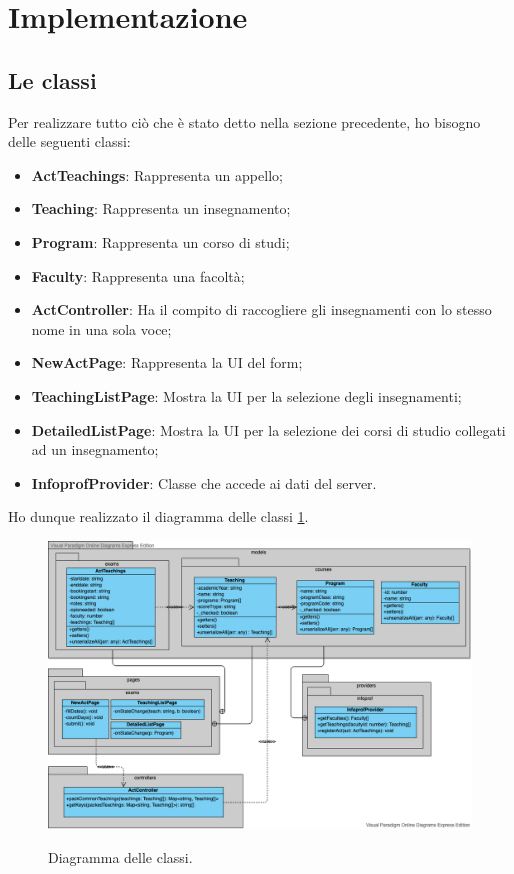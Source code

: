\documentclass[Lau, oneside, noexaminfo]{sapthesis}%
\begin{document}
\newpage
\section{Implementazione}
\label{sec:dev}
\subsection{Le classi}
Per realizzare tutto ciò che è stato detto nella sezione precedente, ho bisogno delle seguenti classi:
\begin{itemize}
	\item \textbf{ActTeachings}: Rappresenta un appello;
	\item \textbf{Teaching}: Rappresenta un insegnamento;
	\item \textbf{Program}: Rappresenta un corso di studi;
	\item \textbf{Faculty}: Rappresenta una facoltà;
	\item \textbf{ActController}: Ha il compito di raccogliere gli insegnamenti con lo stesso nome in una sola voce;
	\item \textbf{NewActPage}: Rappresenta la UI del form;
	\item \textbf{TeachingListPage}: Mostra la UI per la selezione degli insegnamenti;
	\item \textbf{DetailedListPage}: Mostra la UI per la selezione dei corsi di studio collegati ad un insegnamento;
	\item \textbf{InfoprofProvider}: Classe che accede ai dati del server.
\end{itemize}

Ho dunque realizzato il diagramma delle classi \ref{fig:classDiagram}.
\begin{figure}[H]
	\caption{Diagramma delle classi.}
	\centering
	\includegraphics[width=1\textwidth]{diagrams/classDiagram}
	\label{fig:classDiagram}
\end{figure}
\end{document}
